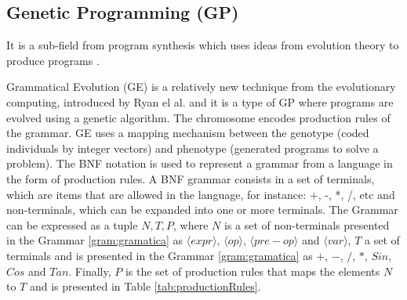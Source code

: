 \documentclass[conference]{IEEEtran}
\begin{document}
\subsection{Genetic Programming {(GP)}}
\label{sec:geneticprogamming}
 It is a sub-field from program synthesis which uses ideas from evolution theory to produce programs \cite{koza1992genetic}. 



Grammatical Evolution (GE) is a relatively new technique from the evolutionary computing, introduced by Ryan el al. \cite{ryan1998grammatical} and it is a type of GP where programs are evolved using a genetic algorithm. The chromosome encodes production rules of the grammar. GE uses a mapping mechanism between the genotype (coded individuals by integer vectors) and phenotype (generated programs to solve a problem). The BNF notation is used to represent a grammar from a language in the form of production rules. A BNF grammar consists in a set of terminals, which are items that are allowed in the language, for instance: +, -, *, /, etc and non-terminals, which can be expanded into one or more terminals. The Grammar can be expressed as a tuple ${N,T,P}$, where $N$ is a set of non-terminals presented in the Grammar \ref{gram:gramatica} as $\langle expr \rangle$, $\langle op \rangle$, $\langle pre - op \rangle$ and $\langle var \rangle$,  $T$ a set of terminals and is presented in the Grammar \ref{gram:gramatica} as $+$, $-$, $/$, $*$, $Sin$, $Cos$ and $Tan$. Finally, $P$ is the set of production rules that maps the elements $N$ to $T$ and is presented in Table \ref{tab:productionRules}.



%
%
\end{document}
